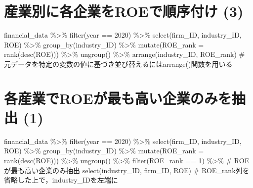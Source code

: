 \documentclass[
  letterpaper,
  DIV=11,
  numbers=noendperiod]{scrreprt}
\newenvironment{Shaded}{\begin{snugshade}}{\end{snugshade}}
\newcommand{\AttributeTok}[1]{\textcolor[rgb]{0.40,0.45,0.13}{#1}}
\newcommand{\CommentTok}[1]{\textcolor[rgb]{0.37,0.37,0.37}{#1}}
\newcommand{\DecValTok}[1]{\textcolor[rgb]{0.68,0.00,0.00}{#1}}
\newcommand{\FunctionTok}[1]{\textcolor[rgb]{0.28,0.35,0.67}{#1}}
\newcommand{\NormalTok}[1]{\textcolor[rgb]{0.00,0.23,0.31}{#1}}
\newcommand{\SpecialCharTok}[1]{\textcolor[rgb]{0.37,0.37,0.37}{#1}}
\begin{document}
\section{産業別に各企業をROEで順序付け
(3)}\label{ux7523ux696dux5225ux306bux5404ux4f01ux696dux3092roeux3067ux9806ux5e8fux4ed8ux3051-3}

\begin{Shaded}
\begin{Highlighting}[]
\NormalTok{financial\_data }\SpecialCharTok{\%\textgreater{}\%} 
  \FunctionTok{filter}\NormalTok{(year }\SpecialCharTok{==} \DecValTok{2020}\NormalTok{) }\SpecialCharTok{\%\textgreater{}\%}
  \FunctionTok{select}\NormalTok{(firm\_ID, industry\_ID, ROE) }\SpecialCharTok{\%\textgreater{}\%}
  \FunctionTok{group\_by}\NormalTok{(industry\_ID) }\SpecialCharTok{\%\textgreater{}\%}
  \FunctionTok{mutate}\NormalTok{(}\AttributeTok{ROE\_rank =} \FunctionTok{rank}\NormalTok{(}\FunctionTok{desc}\NormalTok{(ROE))) }\SpecialCharTok{\%\textgreater{}\%}
  \FunctionTok{ungroup}\NormalTok{() }\SpecialCharTok{\%\textgreater{}\%}
  \FunctionTok{arrange}\NormalTok{(industry\_ID, ROE\_rank) }\CommentTok{\# 元データを特定の変数の値に基づき並び替えるにはarrange()関数を用いる}
\end{Highlighting}
\end{Shaded}

\section{各産業でROEが最も高い企業のみを抽出
(1)}\label{ux5404ux7523ux696dux3067roeux304cux6700ux3082ux9ad8ux3044ux4f01ux696dux306eux307fux3092ux62bdux51fa-1}

\begin{Shaded}
\begin{Highlighting}[]
\NormalTok{financial\_data }\SpecialCharTok{\%\textgreater{}\%} 
  \FunctionTok{filter}\NormalTok{(year }\SpecialCharTok{==} \DecValTok{2020}\NormalTok{) }\SpecialCharTok{\%\textgreater{}\%}
  \FunctionTok{select}\NormalTok{(firm\_ID, industry\_ID, ROE) }\SpecialCharTok{\%\textgreater{}\%}
  \FunctionTok{group\_by}\NormalTok{(industry\_ID) }\SpecialCharTok{\%\textgreater{}\%}
  \FunctionTok{mutate}\NormalTok{(}\AttributeTok{ROE\_rank =} \FunctionTok{rank}\NormalTok{(}\FunctionTok{desc}\NormalTok{(ROE))) }\SpecialCharTok{\%\textgreater{}\%}
  \FunctionTok{ungroup}\NormalTok{() }\SpecialCharTok{\%\textgreater{}\%}
  \FunctionTok{filter}\NormalTok{(ROE\_rank }\SpecialCharTok{==} \DecValTok{1}\NormalTok{) }\SpecialCharTok{\%\textgreater{}\%} \CommentTok{\# ROEが最も高い企業のみ抽出}
  \FunctionTok{select}\NormalTok{(industry\_ID, firm\_ID, ROE) }\CommentTok{\# ROE\_rank列を省略した上で，industry\_IDを左端に}
\end{Highlighting}
\end{Shaded}
\end{document}
